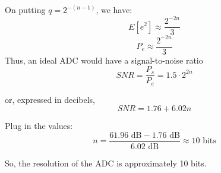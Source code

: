 \documentclass[journal,12pt,onecolumn]{IEEEtran}
\begin{document}
On putting \(q = 2^{-(n-1)}\), we have:
\begin{equation}
E[e^{2}] \approx \frac{2^{-2n}}{3}
\end{equation}
\begin{equation}
P_e \approx \frac{2^{-2n}}{3}
\end{equation}
Thus, an ideal ADC would have a signal-to-noise ratio
\begin{equation}
SNR = \frac{P_s}{P_e} = 1.5 \cdot 2^{2n}
\end{equation}

or, expressed in decibels,
\begin{equation}
SNR = 1.76 + 6.02n
\end{equation}

Plug in the values:
\begin{equation}
n = \frac{61.96 \text{ dB} - 1.76 \text{ dB}}{6.02 \text{ dB}} \approx 10 \text{ bits}
\end{equation}

So, the resolution of the ADC is approximately 10 bits.
\end{document}
